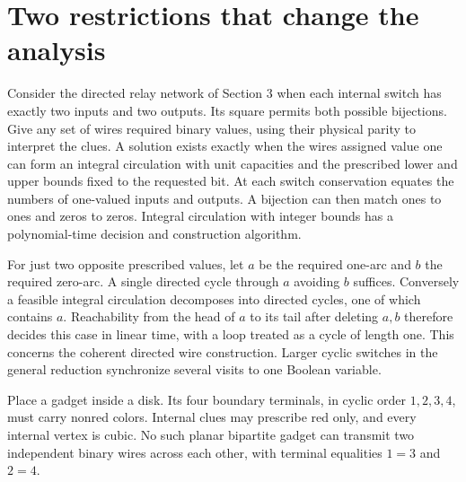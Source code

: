 \documentclass[12pt,letterpaper]{article}
\newcommand{\sh}[1]{\par\smallskip{\bfseries\color{ink}#1}\quad}
\newcommand{\Sec}[1]{\section{\color{ink}#1}}
\begin{document}
\newpage
\Sec{Two restrictions that change the analysis}
\sh{Square switches.}
Consider the directed relay network of Section 3 when each internal switch has exactly two inputs and two outputs. Its square permits both possible bijections. Give any set of wires required binary values, using their physical parity to interpret the clues. A solution exists exactly when the wires assigned value one can form an integral circulation with unit capacities and the prescribed lower and upper bounds fixed to the requested bit. At each switch conservation equates the numbers of one-valued inputs and outputs. A bijection can then match ones to ones and zeros to zeros. Integral circulation with integer bounds has a polynomial-time decision and construction algorithm.

For just two opposite prescribed values, let \(a\) be the required one-arc and \(b\) the required zero-arc. A single directed cycle through \(a\) avoiding \(b\) suffices. Conversely a feasible integral circulation decomposes into directed cycles, one of which contains \(a\). Reachability from the head of \(a\) to its tail after deleting \(a,b\) therefore decides this case in linear time, with a loop treated as a cycle of length one. This concerns the coherent directed wire construction. Larger cyclic switches in the general reduction synchronize several visits to one Boolean variable.

\sh{A planar crossing obstruction.}
Place a gadget inside a disk. Its four boundary terminals, in cyclic order \(1,2,3,4\), must carry nonred colors. Internal clues may prescribe red only, and every internal vertex is cubic. No such planar bipartite gadget can transmit two independent binary wires across each other, with terminal equalities \(1=3\) and \(2=4\).

\begin{center}
\end{center}
\end{document}
